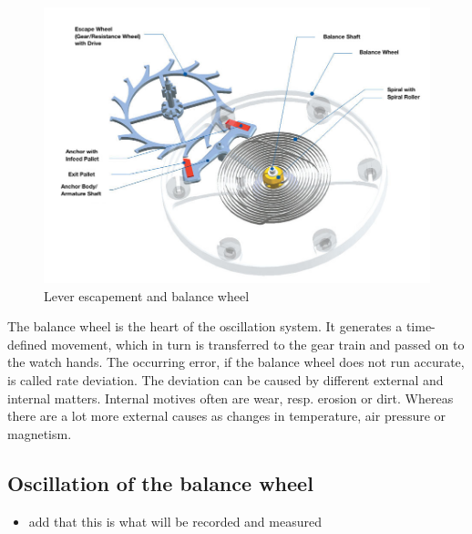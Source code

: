 \documentclass[12pt, a4paper]{report}
\begin{document}
    \noindent
    \begin{figure}[H]
    \centering
    \includegraphics[scale=0.45]{Images/Hemmung-Teil1.jpg}
    
    \caption{Lever escapement and balance wheel \cite{Uhrwerk}}
    \end{figure}
\bigskip
The balance wheel is the heart of the oscillation system. It generates a time-defined movement, which in turn is transferred to the gear train and passed on to the watch hands. 
The occurring error, if the balance wheel does not run accurate, is called rate deviation. The deviation can be caused by different external and internal matters. Internal motives often are wear, resp. erosion or dirt. Whereas there are a lot more external causes as changes in temperature, air pressure or magnetism.

\subsection{Oscillation of the balance wheel}
\begin{itemize}
\item add that this is what will be recorded and measured
\end{itemize}
\end{document}
